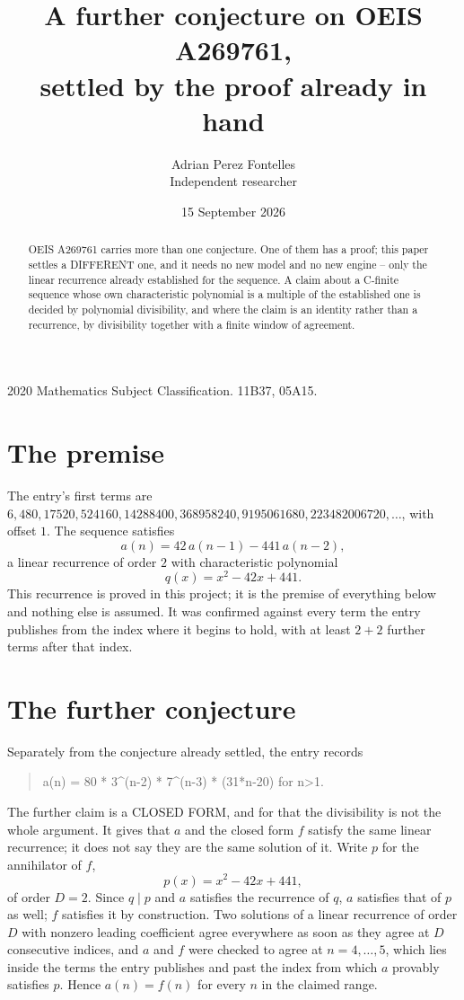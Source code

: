 \documentclass[11pt,a4paper]{article}
\title{A further conjecture on OEIS A269761,\\ \large settled by the proof already in hand}
\author{Adrian Perez Fontelles\\ \small Independent researcher}
\date{15 September 2026}
\theoremstyle{plain}
\theoremstyle{definition}
\begin{document}
\maketitle

\begin{abstract}
OEIS A269761 carries more than one conjecture. One of them has a proof; this paper settles a
DIFFERENT one, and it needs no new model and no new engine -- only the linear recurrence already
established for the sequence. A claim about a C-finite sequence whose own characteristic
polynomial is a multiple of the established one is decided by polynomial divisibility, and where
the claim is an identity rather than a recurrence, by divisibility together with a finite window
of agreement.
\end{abstract}

\noindent\small 2020 Mathematics Subject Classification. 11B37, 05A15.\normalsize

\section{The premise}

The entry's first terms are $6, 480, 17520, 524160, 14288400, 368958240, 9195061680, 223482006720,\dots$, with offset $1$. The sequence satisfies
\[
  a(n)=42\,a(n-1) - 441\,a(n-2) ,
\]
a linear recurrence of order $2$ with characteristic polynomial
\[
  q(x)=x^{2} - 42 x + 441 .
\]
This recurrence is proved in this project; it is the premise of everything below and nothing else is assumed.
It was confirmed against every term the entry publishes from the index where it begins to hold,
with at least $2+2$ further terms after that index.

\section{The further conjecture}

Separately from the conjecture already settled, the entry records

\begin{quote}\raggedright a(n) = 80 * 3\^{}(n-2) * 7\^{}(n-3) * (31*n-20) for n>1.\end{quote}

The further claim is a CLOSED FORM, and for that the divisibility is not the whole argument. It
gives that $a$ and the closed form $f$ satisfy the same linear recurrence; it does not say they
are the same solution of it. Write $p$ for the annihilator of $f$,
\[
  p(x)=x^{2} - 42 x + 441 ,
\]
of order $D=2$. Since $q\mid p$ and $a$ satisfies the recurrence of $q$, $a$ satisfies that of
$p$ as well; $f$ satisfies it by construction. Two solutions of a linear recurrence of order $D$
with nonzero leading coefficient agree everywhere as soon as they agree at $D$ consecutive
indices, and $a$ and $f$ were checked to agree at $n=4,\dots,5$,
which lies inside the terms the entry publishes and past the index from which $a$ provably
satisfies $p$. Hence $a(n)=f(n)$ for every $n$ in the claimed range.
\end{document}
